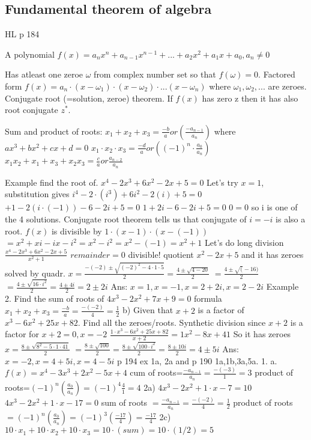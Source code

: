 \subsection{Fundamental theorem of algebra}
HL p 184

A polynomial $f(x)=a_nx^n+a_{n-1}x^{n-1}+...+a_2x^2+a_1x+a_0,a_n\neq 0$

Has atleast one zeroe $\omega$ from complex number set so that $f(\omega)=0$.
Factored form $f(x)=a_n\cdot (x-\omega_1)\cdot (x-\omega_2)\cdot ...(x-\omega_n)$
where $\omega_1,\omega_2,...$ are zeroes.
Conjugate root (=solution, zeroe) theorem.
If $f(x)$ has zero z then it has also root conjugate $z^*$.

Sum and product of roots:
$x_1+x_2+x_3=\frac{-b}{a} or (\frac{-a_{n-1}}{a_n})$ where $ax^3+bx^2+cx+d=0$
$x_1\cdot x_2\cdot x_3=\frac{-d}{a} or ((-1)^n\cdot \frac{a_0}{a_n})$
$x_1x_2+x_1+x_3+x_2x_3=\frac{c}{a} or \frac{a_{n-2}}{a_n}$

Example find the root of.
$x^4-2x^3+6x^2-2x+5=0$
Let's try $x=1$, substitution gives
$i^4-2\cdot(i^3)+6i^2-2(i)+5=0$
$+1-2(i\cdot (-1))-6-2i+5=0$
$1+2i-6-2i+5=0$
$0=0$ so i is one of the 4 solutions.
Conjugate root theorem tells us that conjugate of $i=-i$ is also a root.
$f(x)$ is divisible by $1\cdot(x-1)\cdot(x-(-1))$
$=x^2+xi-ix-i^2=x^2-i^2=x^2-(-1)=x^2+1$
Let's do long division $\frac{x^4-2x^3+6x^2-2x+5}{x^2+1}$
$remainder=0$ divisible!
quotient $x^2-2x+5$ and it has zeroes solved by quadr.
$x=\frac{-(-2)\pm\sqrt{(-2)^2-4\cdot 1\cdot 5}}{2}=\frac{4\pm\sqrt{4-20}}{2}$
$=\frac{4\pm\sqrt(-16)}{2}$
$=\frac{4\pm\sqrt{16\cdot i^2}}{2}=\frac{4\pm4i}{2}=2\pm2i$
Ans: $x=1,x=-1,x=2+2i,x=2-2i$
Example 2. Find the sum of roots of
$4x^3-2x^2+7x+9=0$
formula $x_1+x_2+x_3=\frac{-b}{a}=\frac{-(-2)}{4}=\frac{1}{2}$
b) Given that $x+2$ is a factor of $x^3-6x^2+25x+82$. Find all the zeroes/roots.
Synthetic division since $x+2$ is a factor for $x+2=0,x=-2$
$\frac{1\cdot x^3-6x^2+25x+82}{x+2}=1x^2-8x+41$
So it has zeroes $x=\frac{8\pm\sqrt{8^2-5\cdot 1\cdot 41}}{2}$
$=\frac{8\pm\sqrt{100}}{2}=\frac{8\pm\sqrt{100\cdot i^2}}{2}=\frac{8\pm10i}{2}=4\pm5i$
Ans: $x=-2,x=4+5i,x=4-5i$
p 194 ex 1a, 2a and p 190 1a,1b,3a,5a.
1. a. $f(x)=x^4-3x^3+2x^2-5x+4$
cum of roots=$\frac{-a_{n-1}}{a_n}=\frac{-(-3)}{1}=3$
product of roots=$(-1)^n(\frac{a_0}{a_n})=(-1)^4\frac{4}{1}=4$
2a) $4x^3-2x^2+1\cdot x-7=10$
$4x^3-2x^2+1\cdot x-17=0$
sum of roots $=\frac{-a_{n-1}}{a_n}=\frac{-(-2)}{4}=\frac{1}{2}$
product of roots $=(-1)^n(\frac{a_0}{a_n})=(-1)^3(\frac{-17}{4})=\frac{-17}{4}$
2c) $10\cdot x_1 +10\cdot x_2+ 10\cdot x_3=10\cdot (sum)=10\cdot(1/2)=5$

